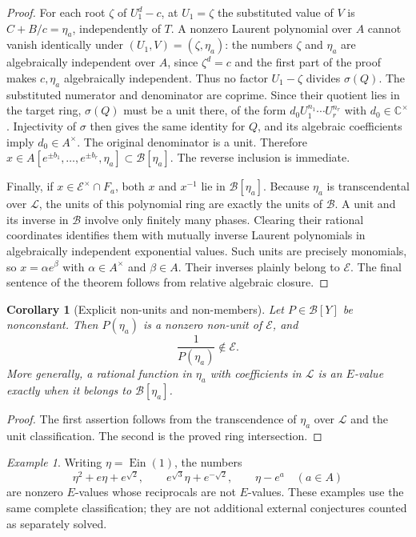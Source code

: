 \documentclass[11pt,a4paper]{article}
\numberwithin{equation}{section}
\newtheorem{corollary}[theorem]{Corollary}
\theoremstyle{definition}
\theoremstyle{remark}
\newtheorem{example}[theorem]{Example}
\begin{document}
\begin{proof}
For each root $\zeta$ of $U_1^d-c$, at $U_1=\zeta$ the substituted value of $V$ is
$C+B/c=\eta_a$, independently of $T$.  A nonzero Laurent polynomial
over $A$ cannot vanish identically under
$(U_1,V)=(\zeta,\eta_a)$: the numbers $\zeta$ and $\eta_a$ are
algebraically independent over $A$, since $\zeta^d=c$ and the first
part of the proof makes $c,\eta_a$ algebraically independent.
Thus no factor $U_1-\zeta$ divides $\sigma(Q)$.
The substituted numerator and denominator are coprime.  Since their
quotient lies in the target ring, $\sigma(Q)$ must be a unit there,
of the form $d_0U_1^{n_1}\cdots U_r^{n_r}$ with $d_0\in\mathbb C^\times$.
Injectivity of $\sigma$ then gives the same identity for $Q$, and its
algebraic coefficients imply $d_0\in A^\times$.  The original
denominator is a unit.  Therefore
$x\in A[e^{\pm b_1},\ldots,e^{\pm b_r},\eta_a]\subset\mathcal B[\eta_a]$.
The reverse inclusion is immediate.

Finally, if $x\in\mathcal E^\times\cap F_a$, both $x$ and $x^{-1}$
lie in $\mathcal B[\eta_a]$.  Because $\eta_a$ is transcendental over
$\mathcal L$, the units of this polynomial ring are exactly the units
of $\mathcal B$.  A unit and its inverse in $\mathcal B$ involve only
finitely many phases.  Clearing their rational coordinates identifies
them with mutually inverse Laurent polynomials in algebraically
independent exponential values.  Such units are precisely monomials,
so $x=\alpha e^\beta$ with $\alpha\in A^\times$ and $\beta\in A$.
Their inverses plainly belong to $\mathcal E$.  The final sentence of
the theorem follows from relative algebraic closure.
\end{proof}

\begin{corollary}[Explicit non-units and non-members]
\label{ev:explicit-nonunits}
Let $P\in\mathcal B[Y]$ be nonconstant.  Then $P(\eta_a)$ is a
nonzero non-unit of $\mathcal E$, and
\[
 \frac1{P(\eta_a)}\notin\mathcal E.
\]
More generally, a rational function in $\eta_a$ with coefficients in
$\mathcal L$ is an $E$-value exactly when it belongs to
$\mathcal B[\eta_a]$.
\end{corollary}
\begin{proof}
The first assertion follows from the transcendence of $\eta_a$ over
$\mathcal L$ and the unit classification.  The second is the proved
ring intersection.
\end{proof}

\begin{example}
Writing $\eta=\operatorname{Ein}(1)$, the numbers
\[
 \eta^2+e\eta+e^{\sqrt2},\qquad
 e^{\sqrt3}\eta+e^{-\sqrt2},\qquad
 \eta-e^a\quad(a\in A)
\]
are nonzero $E$-values whose reciprocals are not $E$-values.  These
examples use the same complete classification; they are not additional
external conjectures counted as separately solved.
\end{example}
\end{document}
